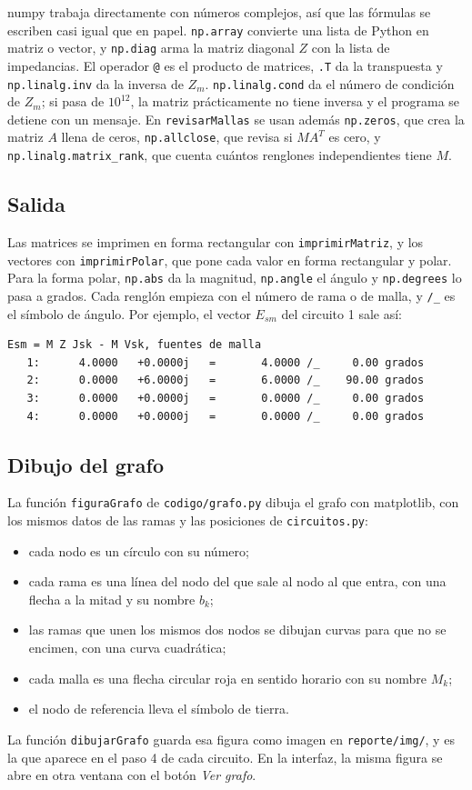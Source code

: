 \documentclass[12pt, letterpaper]{article}
\begin{document}
numpy trabaja directamente con números complejos, así que las fórmulas se escriben casi igual que en papel.
\texttt{np.array} convierte una lista de Python en matriz o vector, y \texttt{np.diag} arma la matriz diagonal $Z$ con
la lista de impedancias. El operador \texttt{@} es el producto de matrices, \texttt{.T} da la transpuesta y
\texttt{np.linalg.inv} da la inversa de $Z_m$. \texttt{np.linalg.cond} da el número de condición de $Z_m$; si pasa de
$10^{12}$, la matriz prácticamente no tiene inversa y el programa se detiene con un mensaje. En \texttt{revisarMallas} se usan además \texttt{np.zeros}, que crea la
matriz $A$ llena de ceros, \texttt{np.allclose}, que revisa si $M A^T$ es cero, y \texttt{np.linalg.matrix\_rank}, que
cuenta cuántos renglones independientes tiene $M$.

\subsection{Salida}

Las matrices se imprimen en forma rectangular con \texttt{imprimirMatriz}, y los vectores con \texttt{imprimirPolar},
que pone cada valor en forma rectangular y polar. Para la forma polar, \texttt{np.abs} da la magnitud,
\texttt{np.angle} el ángulo y \texttt{np.degrees} lo pasa a grados. Cada renglón empieza con el número de rama o de
malla, y \texttt{/\_} es el símbolo de ángulo. Por ejemplo, el vector $E_{sm}$ del circuito 1 sale así:
\begin{lstlisting}[style=salida]
Esm = M Z Jsk - M Vsk, fuentes de malla
   1:      4.0000   +0.0000j   =       4.0000 /_     0.00 grados
   2:      0.0000   +6.0000j   =       6.0000 /_    90.00 grados
   3:      0.0000   +0.0000j   =       0.0000 /_     0.00 grados
   4:      0.0000   +0.0000j   =       0.0000 /_     0.00 grados
\end{lstlisting}

\subsection{Dibujo del grafo}

La función \texttt{figuraGrafo} de \texttt{codigo/grafo.py} dibuja el grafo con matplotlib, con los mismos datos de
las ramas y las posiciones de \texttt{circuitos.py}:
\begin{itemize}
  \item cada nodo es un círculo con su número;
  \item cada rama es una línea del nodo del que sale al nodo al que entra, con una flecha a la mitad y su nombre $b_k$;
  \item las ramas que unen los mismos dos nodos se dibujan curvas para que no se encimen, con una curva cuadrática;
  \item cada malla es una flecha circular roja en sentido horario con su nombre $M_k$;
  \item el nodo de referencia lleva el símbolo de tierra.
\end{itemize}
La función \texttt{dibujarGrafo} guarda esa figura como imagen en \texttt{reporte/img/}, y es la que aparece en el
paso 4 de cada circuito. En la interfaz, la misma figura se abre en otra ventana con el botón \emph{Ver grafo}.
\end{document}
